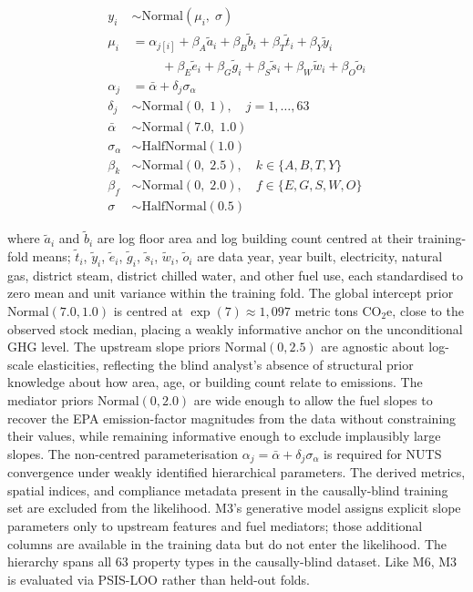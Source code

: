 \[
\begin{aligned}
y_i &\sim \text{Normal}(\mu_i,\; \sigma) \\
\mu_i &= \alpha_{j[i]} + \beta_A \tilde{a}_i + \beta_B \tilde{b}_i + \beta_T \tilde{t}_i + \beta_Y \tilde{y}_i \\
      &\phantom{{}={}}\quad + \beta_E \tilde{e}_i + \beta_G \tilde{g}_i + \beta_S \tilde{s}_i + \beta_W \tilde{w}_i + \beta_O \tilde{o}_i \\
\alpha_j &= \bar{\alpha} + \delta_j \sigma_\alpha \\
\delta_j &\sim \text{Normal}(0,\; 1), \quad j = 1, \ldots, 63 \\
\bar{\alpha} &\sim \text{Normal}(7.0,\; 1.0) \\
\sigma_\alpha &\sim \text{HalfNormal}(1.0) \\
\beta_k &\sim \text{Normal}(0,\; 2.5), \quad k \in \{A, B, T, Y\} \\
\beta_f &\sim \text{Normal}(0,\; 2.0), \quad f \in \{E, G, S, W, O\} \\
\sigma &\sim \text{HalfNormal}(0.5)
\end{aligned}
\]

where $\tilde{a}_i$ and $\tilde{b}_i$ are log floor area and log building count centred at their training-fold means; $\tilde{t}_i$, $\tilde{y}_i$, $\tilde{e}_i$, $\tilde{g}_i$, $\tilde{s}_i$, $\tilde{w}_i$, $\tilde{o}_i$ are data year, year built, electricity, natural gas, district steam, district chilled water, and other fuel use, each standardised to zero mean and unit variance within the training fold. The global intercept prior $\text{Normal}(7.0, 1.0)$ is centred at $\exp(7) \approx 1{,}097$ metric tons CO$_2$e, close to the observed stock median, placing a weakly informative anchor on the unconditional GHG level. The upstream slope priors $\text{Normal}(0, 2.5)$ are agnostic about log-scale elasticities, reflecting the blind analyst's absence of structural prior knowledge about how area, age, or building count relate to emissions. The mediator priors $\text{Normal}(0, 2.0)$ are wide enough to allow the fuel slopes to recover the EPA emission-factor magnitudes from the data without constraining their values, while remaining informative enough to exclude implausibly large slopes. The non-centred parameterisation $\alpha_j = \bar{\alpha} + \delta_j \sigma_\alpha$ is required for NUTS convergence under weakly identified hierarchical parameters. The derived metrics, spatial indices, and compliance metadata present in the causally-blind training set are excluded from the likelihood. M3's generative model assigns explicit slope parameters only to upstream features and fuel mediators; those additional columns are available in the training data but do not enter the likelihood. The hierarchy spans all 63 property types in the causally-blind dataset. Like M6, M3 is evaluated via PSIS-LOO rather than held-out folds.

